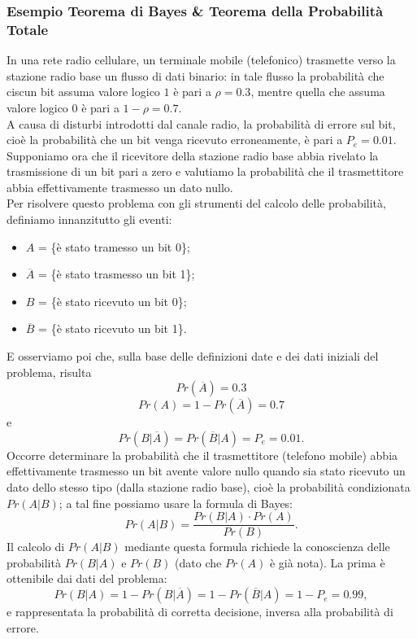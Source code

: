 \documentclass[12pt,oneside,openany]{memoir}
\numberwithin{equation}{subsection}
\begin{document}
\subsubsection{Esempio Teorema di Bayes \& Teorema della Probabilit\`a Totale}
In una rete radio cellulare, un terminale mobile (telefonico) trasmette verso la
stazione radio base un flusso di dati binario: in tale flusso la probabilit\`a
che ciscun bit assuma valore logico $1$ \`e pari a $\rho = 0.3$, mentre quella
che assuma valore logico $0$ \`e pari a $1 - \rho = 0.7$.\\
A causa di disturbi introdotti dal canale radio, la probabilit\`a di errore sul
bit, cio\`e la probabilit\`a che un bit venga ricevuto erroneamente, \`e pari a
$P_e = 0.01$. Supponiamo ora che il ricevitore della stazione radio base abbia
rivelato la trasmissione di un bit pari a zero e valutiamo la probabilit\`a che
il trasmettitore abbia effettivamente trasmesso un dato nullo.\\
Per risolvere questo problema con gli strumenti del calcolo delle probabilit\`a,
definiamo innanzitutto gli eventi:
\begin{itemize}
    \item $A$ = \{\`e stato tramesso un bit 0\};
    \item $\overline{A}$ = \{\`e stato trasmesso un bit 1\};
    \item $B$ = \{\`e stato ricevuto un bit 0\};
    \item $\overline{B}$ = \{\`e stato ricevuto un bit 1\}.
\end{itemize}
E osserviamo poi che, sulla base delle definizioni date e dei dati iniziali del
problema, risulta
\[
    Pr(\overline{A}) = 0.3
\]
\[
    Pr(A) = 1 - Pr(\overline{A}) = 0.7
\]
e
\[
    Pr(B | \overline{A}) = Pr(\overline{B} | A) = P_e = 0.01.
\]
Occorre determinare la probabilit\`a che il trasmettitore (telefono mobile)
abbia effettivamente trasmesso un bit avente valore nullo quando sia stato
ricevuto un dato dello stesso tipo (dalla stazione radio base), cio\`e la
probabilit\`a condizionata $Pr(A | B)$; a tal fine possiamo usare la formula di
Bayes:
\[
    Pr(A | B) = \frac{Pr(B | A) \cdot Pr(A)}{Pr(B)}.
\]
Il calcolo di $Pr(A | B)$ mediante questa formula richiede la conoscienza delle
probabilit\`a $Pr(B | A)$ e $Pr(B)$ (dato che $Pr(A)$ \`e gi\`a nota). La prima
\`e ottenibile dai dati del problema:
\[
    Pr(B | A) = 1 - Pr(B | \overline{A}) = 1 - Pr(\overline{B} | A) = 1 - P_e =
    0.99,
\]
e rappresentata la probabilit\`a di corretta decisione, inversa alla
probabilit\`a di errore.\\
\end{document}
